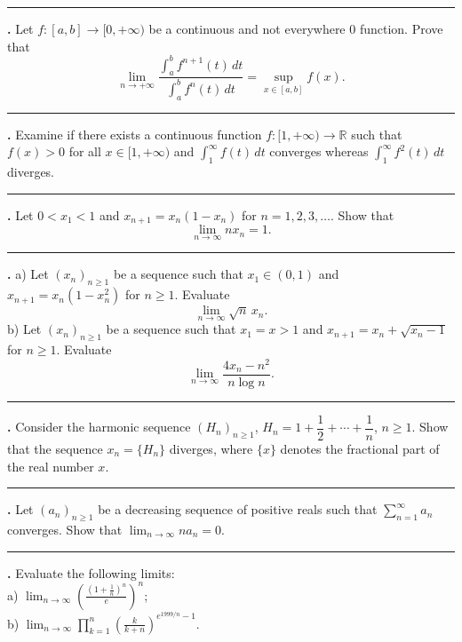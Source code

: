 \documentclass[11pt]{article}
\newcounter{probnum}
\newenvironment{problembox}{\par\noindent\rule{\linewidth}{0.5pt}\vspace{5pt}\par}{\vspace{2pt}}
\begin{document}
\begin{problembox}
\textbf{\theprobnum.} Let $f : [a,b] \to [0,+\infty)$ be a continuous and not everywhere $0$ function. Prove that
\[
\lim_{n \to +\infty} \frac{\displaystyle\int_a^b f^{n+1}(t)\,dt}{\displaystyle\int_a^b f^n(t)\,dt} = \sup_{x \in [a,b]} f(x).
\]
\end{problembox}

\begin{problembox}
\textbf{\theprobnum.} Examine if there exists a continuous function $f : [1,+\infty) \to \mathbb{R}$ such that $f(x) > 0$ for all $x \in [1,+\infty)$ and $\displaystyle\int_1^{\infty} f(t)\,dt$ converges whereas $\displaystyle\int_1^{\infty} f^2(t)\,dt$ diverges.
\end{problembox}

\begin{problembox}
\textbf{\theprobnum.} Let $0 < x_1 < 1$ and $x_{n+1} = x_n(1-x_n)$ for $n = 1,2,3,\ldots$. Show that
\[
\lim_{n \to \infty} n x_n = 1.
\]
\end{problembox}

\begin{problembox}
\textbf{\theprobnum.} a) Let $(x_n)_{n \ge 1}$ be a sequence such that $x_1 \in (0,1)$ and $x_{n+1} = x_n(1-x_n^2)$ for $n \ge 1$. Evaluate
\[
\lim_{n \to \infty} \sqrt{n}\, x_n.
\]
b) Let $(x_n)_{n \ge 1}$ be a sequence such that $x_1 = x > 1$ and $x_{n+1} = x_n + \sqrt{x_n - 1}$ for $n \ge 1$. Evaluate
\[
\lim_{n \to \infty} \frac{4x_n - n^2}{n \log n}.
\]
\end{problembox}

\begin{problembox}
\textbf{\theprobnum.} Consider the harmonic sequence $(H_n)_{n \ge 1}$, $H_n = 1 + \dfrac{1}{2} + \cdots + \dfrac{1}{n}$, $n \ge 1$. Show that the sequence $x_n = \{H_n\}$ diverges, where $\{x\}$ denotes the fractional part of the real number $x$.
\end{problembox}

\begin{problembox}
\textbf{\theprobnum.} Let $(a_n)_{n \ge 1}$ be a decreasing sequence of positive reals such that $\displaystyle\sum_{n=1}^{\infty} a_n$ converges. Show that $\displaystyle\lim_{n \to \infty} n a_n = 0$.
\end{problembox}

\begin{problembox}
\textbf{\theprobnum.} Evaluate the following limits:\\
a) $\displaystyle\lim_{n \to \infty} \left(\frac{\left(1+\frac{1}{n}\right)^n}{e}\right)^n$;\\
b) $\displaystyle\lim_{n \to \infty} \prod_{k=1}^{n} \left(\frac{k}{k+n}\right)^{e^{1999/n}-1}$.
\end{problembox}
\end{document}

